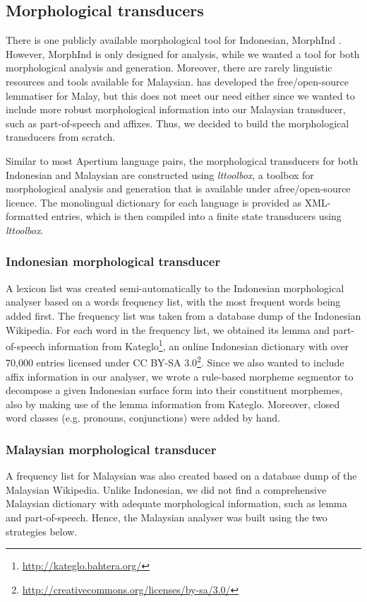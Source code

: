 \documentclass[10pt,a5paper,twoside]{article}
\begin{document}
\subsection{Morphological transducers}
There is one publicly available morphological tool for Indonesian, MorphInd \citep{larasati2011indonesian}. However, MorphInd is only designed for analysis, while we wanted a tool for both morphological analysis and generation. Moreover, there are rarely linguistic resources and tools available for Malaysian. \citet{Baldwin06opensource} has developed the free/open-source lemmatiser for Malay, but this does not meet our need either since we wanted to include more robust morphological information into our Malaysian transducer, such as part-of-speech and affixes. Thus, we decided to build the morphological transducers from scratch.

Similar to most Apertium language pairs, the morphological transducers for both Indonesian and Malaysian are constructed using \emph{lttoolbox}, a toolbox for morphological analysis and generation that is available under afree/open-source licence. The monolingual dictionary for each language is provided as XML-formatted entries, which is then compiled into a finite state transducers using \emph{lttoolbox}.

\subsubsection{Indonesian morphological transducer}
A lexicon list was created semi-automatically to the Indonesian morphological analyser based on a words frequency list, with the most frequent words being added first. The frequency list was taken from a database dump of the Indonesian Wikipedia. For each word in the frequency list, we obtained its lemma and part-of-speech information from Kateglo\footnote{\url{http://kateglo.bahtera.org/}}, an online Indonesian dictionary with over 70,000 entries licensed under CC BY-SA 3.0\footnote{\url{http://creativecommons.org/licenses/by-sa/3.0/}}. Since we also wanted to include affix information in our analyser, we wrote a rule-based morpheme segmentor to decompose a given Indonesian surface form into their constituent morphemes, also by making use of the lemma information from Kateglo. Moreover, closed word classes (e.g. pronouns, conjunctions) were added by hand.

\subsubsection{Malaysian morphological transducer}
A frequency list for Malaysian was also created based on a database dump of the Malaysian Wikipedia. Unlike Indonesian, we did not find a comprehensive Malaysian dictionary with adequate morphological information, such as lemma and part-of-speech. Hence, the Malaysian analyser was built using the two strategies below.
\end{document}
